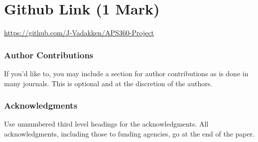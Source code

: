 \documentclass{article} %
\begin{document}
\section{Github Link (1 Mark)}
\href{https://github.com/J-Vadakken/APS360-Project}{https://github.com/J-Vadakken/APS360-Project}



\subsubsection*{Author Contributions}
If you'd like to, you may include  a section for author contributions as is done
in many journals. This is optional and at the discretion of the authors.

\subsubsection*{Acknowledgments}
Use unnumbered third level headings for the acknowledgments. All
acknowledgments, including those to funding agencies, go at the end of the paper.

\label{last_page}



\end{document}
